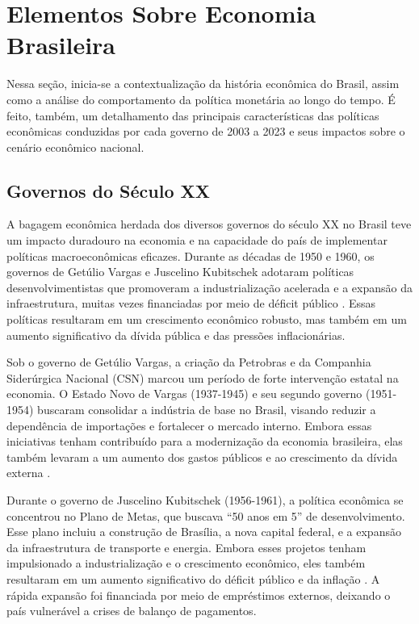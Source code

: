\documentclass[12pt,oneside,a4paper,chapter=TITLE,english,brazil,sumario=abnt-6027-2012]{abntex2}
\begin{document}
\chapter{Elementos Sobre Economia Brasileira}

Nessa seção, inicia-se a contextualização da história econômica do Brasil, assim como a análise do comportamento da política monetária ao longo do tempo. É feito, também, um detalhamento das principais características das políticas econômicas conduzidas por cada governo de 2003 a 2023 e seus impactos sobre o cenário econômico nacional.

\section{Governos do Século XX}

A bagagem econômica herdada dos diversos governos do século XX no Brasil teve um impacto duradouro na economia e na capacidade do país de implementar políticas macroeconômicas eficazes. Durante as décadas de 1950 e 1960, os governos de Getúlio Vargas e Juscelino Kubitschek adotaram políticas desenvolvimentistas que promoveram a industrialização acelerada e a expansão da infraestrutura, muitas vezes financiadas por meio de déficit público \cite{bielschowsky_2022_a}. Essas políticas resultaram em um crescimento econômico robusto, mas também em um aumento significativo da dívida pública e das pressões inflacionárias.

Sob o governo de Getúlio Vargas, a criação da Petrobras e da Companhia Siderúrgica Nacional (CSN) marcou um período de forte intervenção estatal na economia. O Estado Novo de Vargas (1937-1945) e seu segundo governo (1951-1954) buscaram consolidar a indústria de base no Brasil, visando reduzir a dependência de importações e fortalecer o mercado interno. Embora essas iniciativas tenham contribuído para a modernização da economia brasileira, elas também levaram a um aumento dos gastos públicos e ao crescimento da dívida externa \cite{fabiogiambiagi_2016_economia}.

Durante o governo de Juscelino Kubitschek (1956-1961), a política econômica se concentrou no Plano de Metas, que buscava ``50 anos em 5'' de desenvolvimento. Esse plano incluiu a construção de Brasília, a nova capital federal, e a expansão da infraestrutura de transporte e energia. Embora esses projetos tenham impulsionado a industrialização e o crescimento econômico, eles também resultaram em um aumento significativo do déficit público e da inflação \cite{bielschowsky_2022_a}. A rápida expansão foi financiada por meio de empréstimos externos, deixando o país vulnerável a crises de balanço de pagamentos.
\end{document}
